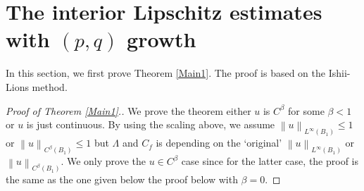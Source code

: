 \documentclass[reqno]{amsart}
\theoremstyle{plain}
\theoremstyle{definition}
\theoremstyle{remark}
\newcommand{\norm}[1]{\left\lVert#1\right\rVert}
\numberwithin{equation}{section}
\begin{document}
\section{The interior Lipschitz estimates with $(p,q)$ growth} \label{sec3}
In this section, we first prove Theorem \ref{Main1}. The proof is based on the Ishii-Lions method.
\begin{proof}[Proof of Theorem \ref{Main1}.]
    We prove the theorem either $u$ is $C^\beta$ for some $\beta<1$ or $u$ is just continuous.
    By using the scaling above, we assume $\norm{u}_{L^\infty(B_1)} \leq 1$ or $\norm{u}_{C^\beta(B_1)} \leq 1$  but $\Lambda$ and $C_f$ is depending on the `original' $\norm{u}_{L^\infty(B_1)}$ or $\norm{u}_{C^\beta(B_1)}$. 
    We only prove the $u \in C^\beta$ case since for the latter case, the proof is the same as the one given below the proof below with $\beta = 0$. 
    

\end{proof}
\end{document}
